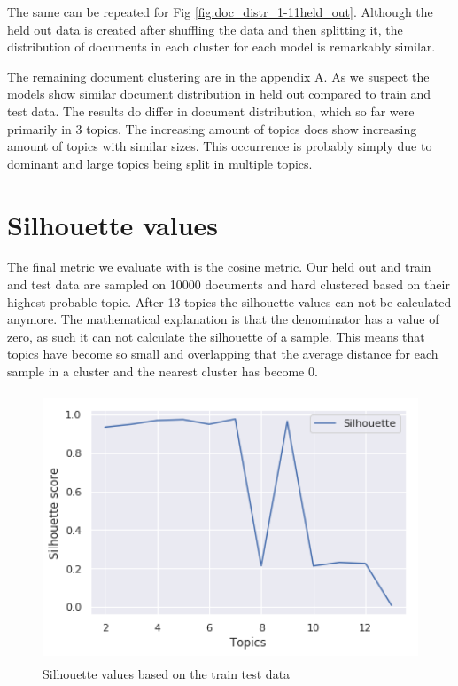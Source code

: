 The same can be repeated for Fig \ref{fig:doc_distr_1-11held_out}. Although the held out data is created after shuffling the data and then splitting it, the distribution of documents in each cluster for each model is remarkably similar. 

The remaining document clustering are in the appendix A. As we suspect the models show similar document distribution in held out compared to train and test data. The results do differ in document distribution, which so far were primarily in 3 topics. The increasing amount of topics does show increasing amount of topics with similar sizes. This occurrence is probably simply due to dominant and large topics being split in multiple topics.

\FloatBarrier

\section{Silhouette values}\label{results:silhouette}
The final metric we evaluate with is the cosine metric. Our held out and train and test data are sampled on 10000 documents and hard clustered based on their highest probable topic. After 13 topics the silhouette values can not be calculated anymore. The mathematical explanation is that the denominator has a value of zero, as such it can not calculate the silhouette of a sample. This means that topics have become so small and overlapping that the average distance for each sample in a cluster and the nearest cluster has become 0.

\begin{figure}[h]
    \centering
    \includegraphics[width=15cm, height=8cm]{figures/silhouette_values_topics_corpus.png}
    \caption{Silhouette values based on the train test data}
    \label{fig:Train test dataset}
\end{figure}

